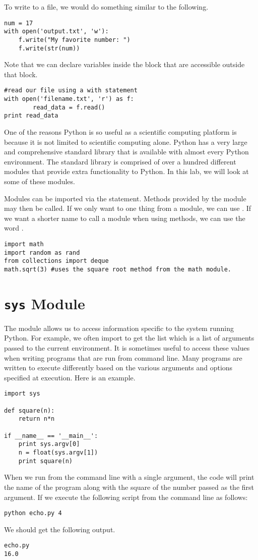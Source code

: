 To write to a file, we would do something similar to the following.
\begin{lstlisting}
num = 17
with open('output.txt', 'w'):
    f.write("My favorite number: ")
    f.write(str(num))
\end{lstlisting}

Note that we can declare variables inside the  block that are accessible outside that block.
\begin{lstlisting}
#read our file using a with statement
with open('filename.txt', 'r') as f:
        read_data = f.read()
print read_data
\end{lstlisting}

One of the reasons Python is so useful as a scientific computing platform is because it is not limited to scientific computing alone.
Python has a very large and comprehensive standard library that is available with almost every Python environment.
The standard library is comprised of over a hundred different modules that provide extra functionality to Python.
In this lab, we will look at some of these modules.

Modules can be imported via the  statement. Methods provided by the module may then be called.
If we only want to one thing from a module, we can use .
If we want a shorter name to call a module when using methods, we can use the word .
\begin{lstlisting}
import math
import random as rand
from collections import deque
math.sqrt(3) #uses the square root method from the math module.
\end{lstlisting}

\section*{\texttt{sys} Module}
The  module allows us to access information specific to the system running Python.
For example, we often import  to get the list  which is a list of arguments passed to the current environment.
It is sometimes useful to access these values when writing programs that are run from command line.
Many programs are written to execute differently based on the various arguments and options specified at execution.
Here is an example.
\begin{lstlisting}
import sys

def square(n):
    return n*n
        
if __name__ == '__main__':
    print sys.argv[0]
    n = float(sys.argv[1])
    print square(n)
\end{lstlisting}
When we run from the command line with a single argument, the code will print the name of the program along with the square of the number passed as the first argument.
If we execute the following script from the command line as follows:
\begin{lstlisting}[style=ShellInput]
python echo.py 4
\end{lstlisting}
We should get the following output.
\begin{lstlisting}[style=ShellOutput]
echo.py
16.0
\end{lstlisting}

